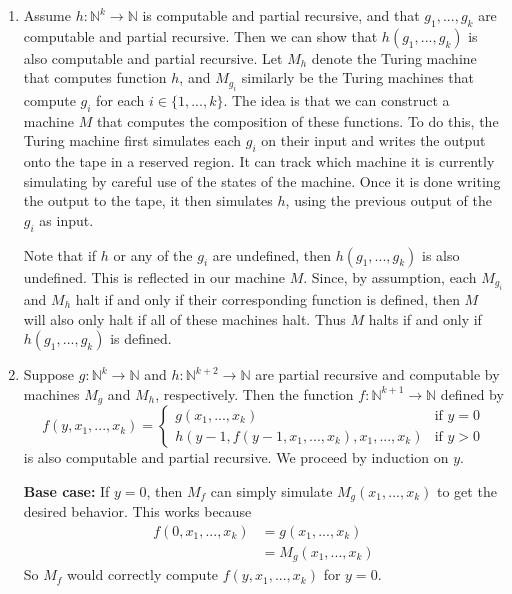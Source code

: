 \documentclass{article}
\newcommand{\nat}{\mathbb{N}}
\begin{document}
\begin{enumerate}
    \item Assume $h: \nat^k \to \nat$ is computable and partial recursive, and that $g_1, ..., g_k$ are computable and partial recursive. 
    Then we can show that $h(g_1, ..., g_k)$ is also computable and partial recursive.
    Let $M_h$ denote the Turing machine that computes function $h$, and $M_{g_i}$ similarly be the Turing machines that compute $g_i$ for each $i \in \{1, ..., k\}$.
    The idea is that we can construct a machine $M$ that computes the composition of these functions.
    To do this, the Turing machine first simulates each $g_i$ on their input and writes the output onto the tape in a reserved region.
    It can track which machine it is currently simulating by careful use of the states of the machine.
    Once it is done writing the output to the tape, it then simulates $h$, using the previous output of the $g_i$ as input.
    
    Note that if $h$ or any of the $g_i$ are undefined, then $h(g_1, ..., g_k)$ is also undefined. 
    This is reflected in our machine $M$.
    Since, by assumption, each $M_{g_i}$ and $M_h$ halt if and only if their corresponding function is defined, then $M$ will also only halt if all of these machines halt.
    Thus $M$ halts if and only if $h(g_1, ..., g_k)$ is defined.

    \item Suppose $g : \nat^k \to \nat$ and $h: \nat^{k+2}\to \nat$ are partial recursive and computable by machines $M_g$ and $M_h$, respectively.
    Then the function $f: \nat^{k+1} \to \nat$ defined by
    $$f(y, x_1, ..., x_k) = \begin{cases}
            g(x_1, ..., x_k)
            & \text{if }y=0
            \\
            h(y-1, f(y-1,x_1,..., x_k), x_1,..., x_k)
            & \text{if }y > 0
        \end{cases}$$
        is also computable and partial recursive.
    We proceed by induction on $y$.

    \textbf{Base case:}
    If $y= 0$, then $M_f$ can simply simulate $M_g(x_1, ..., x_k)$ to get the desired behavior.
    This works because 
    \begin{align*}
        f(0, x_1, ..., x_k) &= g(x_1, ..., x_k)\\
        &= M_g(x_1, ..., x_k)
    \end{align*}
    So $M_f$ would correctly compute $f(y, x_1, ..., x_k)$ for $y=0$.
    

\end{enumerate}
\end{document}
